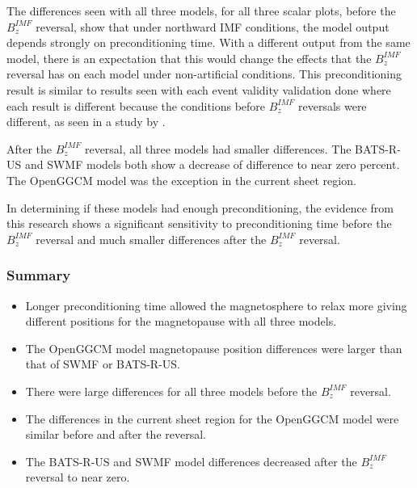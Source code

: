 The differences seen with all three models, for all three scalar plots, before
the $B_z^{IMF}$ reversal, show that under northward IMF conditions, the model output depends strongly on preconditioning time. With a different output from the same model, there
is an expectation that this would change the effects that the $B_z^{IMF}$ reversal has
on each model under non-artificial conditions. This preconditioning result is similar to results seen with each event validity
validation done where each result is different because the conditions before
$B_z^{IMF}$ reversals were different, as seen in a study by \citet{Juusola2013}.

After the $B_z^{IMF}$ reversal, all three models had smaller differences. The BATS-R-US and SWMF
models both show a decrease of difference to near zero percent. The OpenGGCM
model was the exception in the current sheet region.

In determining if these models had enough preconditioning, the evidence from
this research shows a significant sensitivity to preconditioning time before the
$B_z^{IMF}$ reversal and much smaller differences after the $B_z^{IMF}$
reversal.

\subsubsection{Summary}
\begin{itemize}
  \item Longer preconditioning time allowed the magnetosphere to relax more
  giving different positions for the magnetopause with all three models.
  \item The OpenGGCM model magnetopause position differences were larger than
  that of SWMF or BATS-R-US.
  \item There were large differences for all three models before the $B_z^{IMF}$
  reversal.
  \item The differences in the current sheet region for the OpenGGCM model were similar before and after the reversal.
  \item The BATS-R-US and SWMF model differences decreased after the $B_z^{IMF}$
  reversal to near zero.
\end{itemize}
